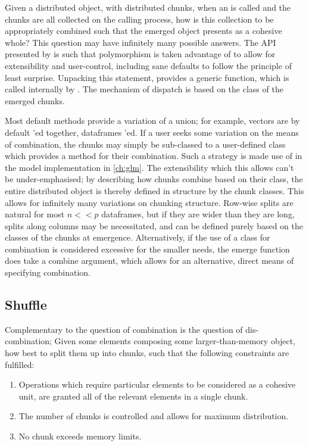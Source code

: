 Given a distributed object, with distributed chunks, when an  is called and the chunks are all collected on the calling process, how is this collection to be appropriately combined such that the emerged object presents as a cohesive whole?
This question may have infinitely many possible answers.
The API presented by \lsr{} is such that polymorphism is taken advantage of to allow for extensibility and user-control, including sane defaults to follow the principle of least surprise.
Unpacking this statement, \lsr{} provides a generic  function, which is called internally by .
The mechanism of dispatch is based on the class of the emerged chunks.

Most default  methods provide a variation of a union; for example, vectors are by default 'ed together, dataframes 'ed.
If a user seeks some variation on the means of combination, the chunks may simply be sub-classed to a user-defined class which provides a  method for their combination.
Such a strategy is made use of in the model implementation in \cref{ch:glm}.
The extensibility which this allows can't be under-emphasised; by describing how chunks combine based on their class, the entire distributed object is thereby defined in structure by the chunk classes.
This allows for infinitely many variations on chunking structure.
Row-wise splits are natural for most $n<<p$ dataframes, but if they are wider than they are long, splits along columns may be necessitated, and can be defined purely based on the classes of the chunks at emergence.
Alternatively, if the use of a class for combination is considered excessive for the smaller needs, the emerge function does take a combine argument, which allows for an alternative, direct means of specifying combination.

\subsection{Shuffle}\label{sec:shuffle}

Complementary to the question of combination is the question of dis-combination;
Given some elements composing some larger-than-memory object, how best to split them up into chunks, such that the following constraints are fulfilled:

\begin{enumerate}
\item Operations which require particular elements to be considered as a cohesive unit, are granted all of the relevant elements in a single chunk.
\item The number of chunks is controlled and allows for maximum distribution.
\item No chunk exceeds memory limits.
\end{enumerate}

